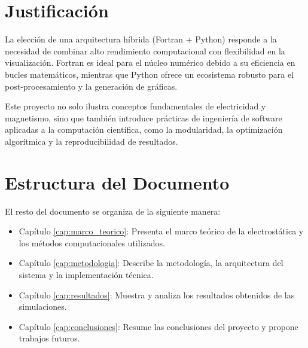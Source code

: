 \section{Justificación}
La elección de una arquitectura híbrida (Fortran + Python) responde a la necesidad de combinar alto rendimiento computacional con flexibilidad en la visualización. Fortran es ideal para el núcleo numérico debido a su eficiencia en bucles matemáticos, mientras que Python ofrece un ecosistema robusto para el post-procesamiento y la generación de gráficas.

Este proyecto no solo ilustra conceptos fundamentales de electricidad y magnetismo, sino que también introduce prácticas de ingeniería de software aplicadas a la computación científica, como la modularidad, la optimización algorítmica y la reproducibilidad de resultados.

\section{Estructura del Documento}
El resto del documento se organiza de la siguiente manera:

\begin{itemize}
    \item Capítulo \ref{cap:marco_teorico}: Presenta el marco teórico de la electrostática y los métodos computacionales utilizados.
    \item Capítulo \ref{cap:metodologia}: Describe la metodología, la arquitectura del sistema y la implementación técnica.
    \item Capítulo \ref{cap:resultados}: Muestra y analiza los resultados obtenidos de las simulaciones.
    \item Capítulo \ref{cap:conclusiones}: Resume las conclusiones del proyecto y propone trabajos futuros.
\end{itemize}
